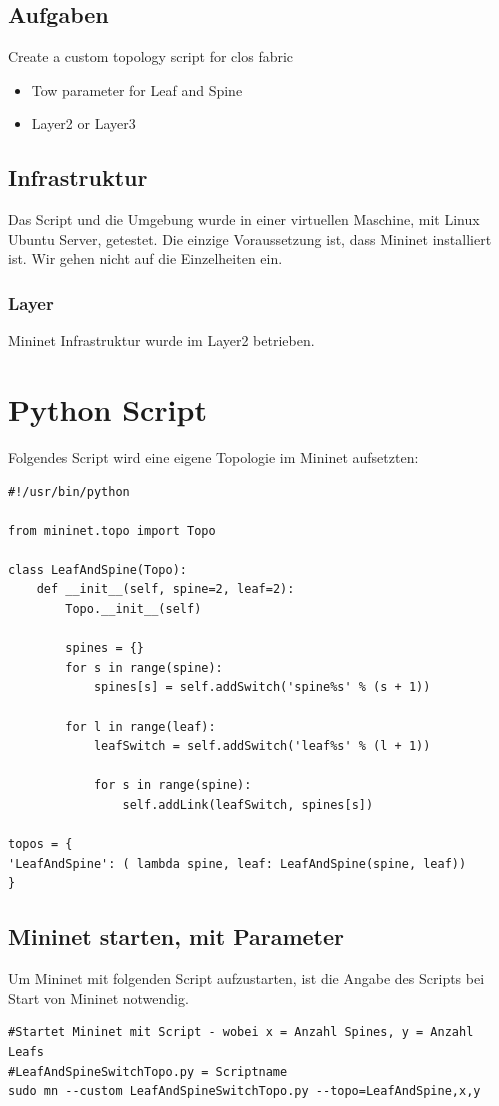 \documentclass[a4,12pt]{scrartcl}
\begin{document}
\subsection{Aufgaben}
Create a custom topology script for clos fabric
\begin{itemize}
\item Tow parameter for Leaf and Spine
\item Layer2 or Layer3
\end{itemize}

\subsection{Infrastruktur}
Das Script und die Umgebung wurde in einer virtuellen Maschine, mit Linux Ubuntu Server, getestet. Die einzige Voraussetzung ist, dass Mininet installiert ist. Wir gehen nicht auf die Einzelheiten ein.

\subsubsection{Layer}
Mininet Infrastruktur wurde im Layer2 betrieben.

\section{Python Script}
Folgendes Script wird eine eigene Topologie im Mininet aufsetzten: \\

\begin{lstlisting}
#!/usr/bin/python

from mininet.topo import Topo

class LeafAndSpine(Topo):
    def __init__(self, spine=2, leaf=2):
        Topo.__init__(self)

        spines = {}
        for s in range(spine):
            spines[s] = self.addSwitch('spine%s' % (s + 1))

        for l in range(leaf):
            leafSwitch = self.addSwitch('leaf%s' % (l + 1))

            for s in range(spine):
                self.addLink(leafSwitch, spines[s])

topos = { 
'LeafAndSpine': ( lambda spine, leaf: LeafAndSpine(spine, leaf)) 
}
\end{lstlisting}

\subsection{Mininet starten, mit Parameter}
Um Mininet mit folgenden Script aufzustarten, ist die Angabe des Scripts bei Start von Mininet notwendig. 
\begin{lstlisting}
#Startet Mininet mit Script - wobei x = Anzahl Spines, y = Anzahl Leafs
#LeafAndSpineSwitchTopo.py = Scriptname 
sudo mn --custom LeafAndSpineSwitchTopo.py --topo=LeafAndSpine,x,y 
\end{lstlisting}
\end{document}
